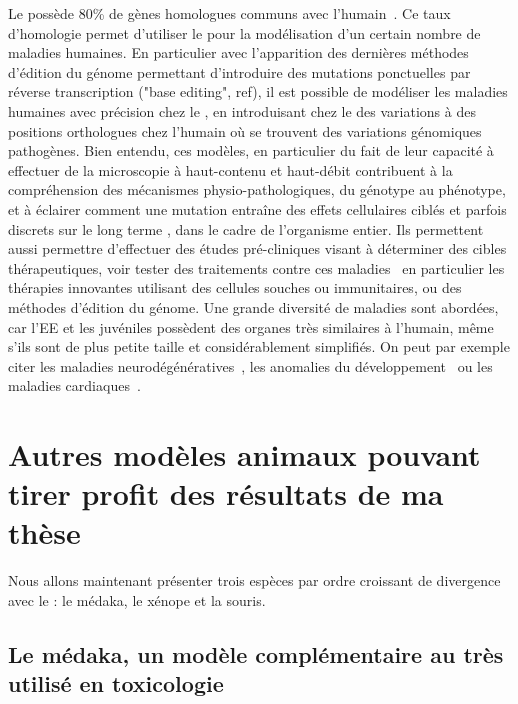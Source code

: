 \documentclass[\main/main.tex]{subfiles}
\begin{document}
%
Le \pz{} possède 80\% de gènes homologues communs avec l'humain~\cite{howe_2013}. 
Ce taux d'homologie permet d'utiliser le \pz{} pour la modélisation d'un certain nombre de maladies humaines.
En particulier avec l'apparition des dernières méthodes d'édition du génome permettant d'introduire des mutations ponctuelles par réverse transcription ("base editing", ref), il est possible de modéliser les maladies humaines avec précision chez le \pz{}, en introduisant chez le \pz{} des variations à des positions orthologues chez l'humain où se trouvent des variations génomiques pathogènes.
Bien entendu, ces modèles, en particulier du fait de leur capacité à effectuer de la microscopie à haut-contenu et haut-débit contribuent à la compréhension des mécanismes physio\hyp{}pathologiques, du génotype au phénotype, et à éclairer comment une mutation entraîne des effets cellulaires ciblés et parfois discrets sur le long terme , dans le cadre de l'organisme entier.
Ils permettent aussi permettre d'effectuer des études pré-cliniques visant à déterminer des cibles thérapeutiques, voir tester des traitements contre ces maladies~\cite{vaz_2018,pitchai_2019,saleem_2018} en particulier les thérapies innovantes utilisant des cellules souches ou immunitaires, ou des méthodes d'édition du génome. 
%
Une grande diversité de maladies sont abordées, car l'EE et les juvéniles possèdent des organes très similaires à l'humain, même s'ils sont de plus petite taille et considérablement simplifiés. On peut par exemple citer les maladies neurodégénératives~\cite{fontana_2018}, les anomalies du développement~\cite{lovely_2016,sarmah_2016} ou les maladies cardiaques~\cite{brown_2016, walcott_2014}.


\section{Autres modèles animaux pouvant tirer profit des résultats de ma thèse \label{sec:intro:modele}}

Nous allons maintenant présenter trois espèces par ordre croissant de divergence avec le \pz{}: le médaka, le xénope et la souris.

    \subsection{\label{sec:medaka}Le médaka, un modèle complémentaire au \pz{} très utilisé en toxicologie}
    
\end{document}
